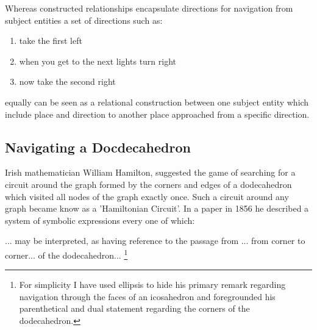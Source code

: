 \noindent Whereas constructed relationships encapsulate directions for navigation from subject entities a set of directions such as:
\begin{enumerate}
	\item take the first left
	\item when you get to the next lights turn right
	\item now take the second right
\end{enumerate}
equally can be seen as a relational construction between one subject entity which include place and direction to another place
approached from a specific direction. 

\subsection{Navigating a Docdecahedron}

Irish mathematician William Hamilton, suggested the game of searching for a circuit around the graph formed by the 
corners and edges of a dodecahedron which visited all nodes of the graph exactly once. Such a circuit
around any graph became know as a 'Hamiltonian Circuit'. In a paper in 1856 he  described a system of symbolic expressions
every one of which:
\begin{erquote}
... may be interpreted, as having reference to the passage from ... from corner to corner... of the dodecahedron...
\footnote{\noindent For simplicity I have used ellipsis to hide his primary remark regarding navigation through the faces of an icosahedron 
and foregrounded his parenthetical and dual statement regarding the corners of the dodecahedron. }
\end{erquote}

